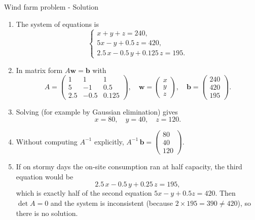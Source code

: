 \documentclass[9pt]{beamer}
\begin{document}
\begin{frame}{Wind farm problem - Solution}
\small
    \begin{enumerate}[label=(\alph*)]
  \item The system of equations is
  $$
    \begin{cases}
      x + y + z = 240,\\
      5x - y + 0.5\,z = 420,\\
      2.5\,x - 0.5\,y + 0.125\,z = 195.
    \end{cases}
  $$
  \item In matrix form \(A\mathbf w=\mathbf b\) with
  \[
    A=\begin{pmatrix}
      1   & 1      & 1     \\[3pt]
      5   & -1     & 0.5   \\[3pt]
      2.5 & -0.5   & 0.125
    \end{pmatrix},\quad
    \mathbf w=\begin{pmatrix}x\\y\\z\end{pmatrix},\quad
    \mathbf b=\begin{pmatrix}240\\420\\195\end{pmatrix}.
  \]
  \item Solving (for example by Gaussian elimination) gives
  \[
    x = 80,\quad
    y = 40,\quad
    z = 120.
  \]
  \item Without computing \(A^{-1}\) explicitly, $A^{-1}\,\mathbf b = \begin{pmatrix}80\\40\\120\end{pmatrix}$.
  \item If on stormy days the on‑site consumption ran at half capacity, the third equation would be
  \[
    2.5\,x - 0.5\,y + 0.25\,z = 195,
  \]
  which is exactly half of the second equation \(5x - y + 0.5z = 420\). Then \(\det A=0\) and the system is inconsistent (because \(2\times195=390\neq420\)), so there is no solution.
\end{enumerate}
\end{frame}


\end{document}
